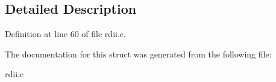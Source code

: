 \subsection{Detailed Description}


Definition at line 60 of file rdii.\+c.



The documentation for this struct was generated from the following file\+:\begin{DoxyCompactItemize}
\item 
rdii.\+c\end{DoxyCompactItemize}
